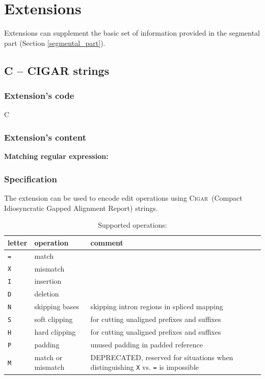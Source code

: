\documentclass[10pt,a4paper]{article}
\newcommand{\re}[1]{\framebox{\mbox{\texttt{#1}}}}
\newcommand{\mre}[1]{\hspace{0.5cm}\textbf{Matching regular expression:} \re{#1}\smallskip}
\newcommand{\CIGAR}{\textsc{Cigar}}
\begin{document}

\section{Extensions}
\label{sec:extensions}
\appendix

Extensions can supplement the basic set of information provided in the segmental part (Section \ref{segmental_part}).

\subsection*{C -- CIGAR strings}

\subsubsection*{Extension's code}

\hspace{0.5cm} C

\subsubsection*{Extension's content}

\mre{\char94(?:([0-9]+[=XIDNSHPM]+)(?:,(?!\char36)|\char36))+\char36}


\subsubsection*{Specification}

The extension can be used to encode edit operations 
using \CIGAR\  (Compact Idiosyncratic Gapped Alignment Report) strings.

\medskip

\begin{table}[h]
\centering
\caption*{Supported operations:}
\begin{tabular}{|l|l|p{8cm}|}
	\hline
	letter & operation & comment 
	\\\hline
	\texttt{=} & match & \\
	\texttt{X} & mismatch & \\
	\texttt{I} & insertion & \\
	\texttt{D} & deletion &	\\
	\texttt{N} & skipping bases & skipping intron regions in spliced mapping \\
	\texttt{S} & soft clipping &
		for cutting unaligned prefixes and suffixes \\
	\texttt{H} & hard clipping &
		for cutting unaligned prefixes and suffixes \\
	\texttt{P} & padding & unused padding in padded reference\\
	\texttt{M} & match or mismatch	& DEPRECATED, reserved for situations when distinguishing \texttt{X} vs. \texttt{=}
is impossible
	\\\hline
\end{tabular}
\end{table}
\end{document}
